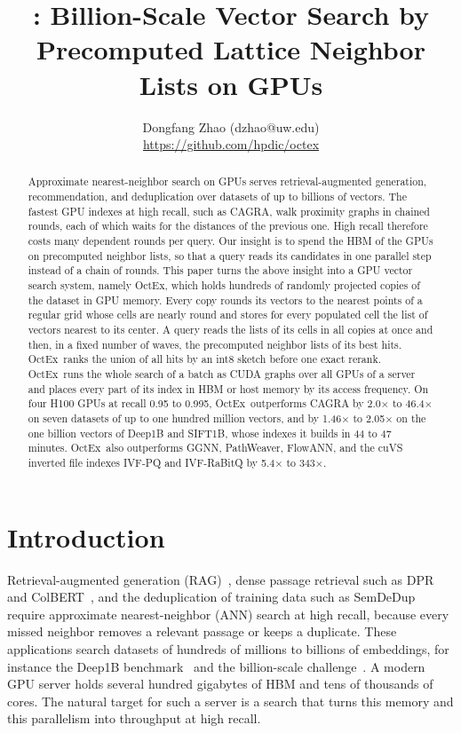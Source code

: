 \documentclass[letterpaper,twocolumn,10pt]{article}
\title{\Large \bf \sysname: Billion-Scale Vector Search by Precomputed Lattice Neighbor Lists on GPUs}
\author{{\rm Dongfang Zhao (dzhao@uw.edu)}\\{\upshape\url{https://github.com/hpdic/octex}}}
\newcommand{\sysname}{OctEx}
\begin{document}
\maketitle

\begin{abstract}
Approximate nearest-neighbor search on GPUs serves retrieval-augmented generation, recommendation, and deduplication over datasets of up to billions of vectors. The fastest GPU indexes at high recall, such as CAGRA, walk proximity graphs in chained rounds, each of which waits for the distances of the previous one. High recall therefore costs many dependent rounds per query. Our insight is to spend the HBM of the GPUs on precomputed neighbor lists, so that a query reads its candidates in one parallel step instead of a chain of rounds. This paper turns the above insight into a GPU vector search system, namely \sysname, which holds hundreds of randomly projected copies of the dataset in GPU memory. Every copy rounds its vectors to the nearest points of a regular grid whose cells are nearly round and stores for every populated cell the list of vectors nearest to its center. A query reads the lists of its cells in all copies at once and then, in a fixed number of waves, the precomputed neighbor lists of its best hits. \sysname\ ranks the union of all hits by an int8 sketch before one exact rerank. \sysname\ runs the whole search of a batch as CUDA graphs over all GPUs of a server and places every part of its index in HBM or host memory by its access frequency. On four H100 GPUs at recall 0.95 to 0.995, \sysname\ outperforms CAGRA by 2.0$\times$ to 46.4$\times$ on seven datasets of up to one hundred million vectors, and by 1.46$\times$ to 2.05$\times$ on the one billion vectors of Deep1B and SIFT1B, whose indexes it builds in 44 to 47 minutes. \sysname\ also outperforms GGNN, PathWeaver, FlowANN, and the cuVS inverted file indexes IVF-PQ and IVF-RaBitQ by 5.4$\times$ to 343$\times$.
\end{abstract}

\section{Introduction}
\label{sec:intro}

Retrieval-augmented generation (RAG)~\cite{lewis2020rag}, dense passage retrieval such as DPR~\cite{karpukhin2020dpr} and ColBERT~\cite{khattab2020colbert}, and the deduplication of training data such as SemDeDup~\cite{abbas2023semdedup} require approximate nearest-neighbor (ANN) search at high recall, because every missed neighbor removes a relevant passage or keeps a duplicate. These applications search datasets of hundreds of millions to billions of embeddings, for instance the Deep1B benchmark~\cite{babenko2016deep} and the billion-scale challenge~\cite{simhadri2022bigann}. A modern GPU server holds several hundred gigabytes of HBM and tens of thousands of cores. The natural target for such a server is a search that turns this memory and this parallelism into throughput at high recall.
\end{document}
